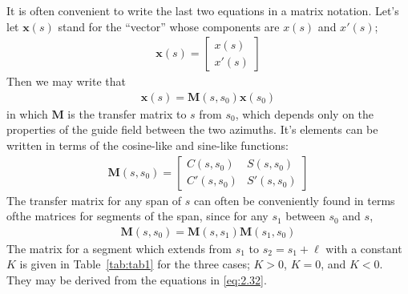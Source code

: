 It is often convenient to write the last two equations in a matrix notation. Let's let $\boldsymbol{x}(s)$ stand for the “vector” whose components are $x(s)$ and $x'(s)$;
\begin{align}
	\boldsymbol{x}(s) = \begin{bmatrix}
	x(s)\\
	x'(s)
	\end{bmatrix}
\end{align}
Then we may write that
\begin{align}
	\boldsymbol{x}(s)=\boldsymbol{M}(s,s_0)\boldsymbol{x}(s_0)
\end{align}
in which $\boldsymbol{M}$ is the transfer matrix to $s$ from $s_0$, which depends only on the properties of the guide field between the two azimuths. It's elements can be written in terms of the cosine-like and sine-like functions:
\begin{align}
	\boldsymbol{M}(s,s_0) = \begin{bmatrix}
	C(s,s_0) & S(s,s_0)\\
	C'(s,s_0) & S'(s,s_0)
	\end{bmatrix}\label{eq:2.37}
\end{align}
The transfer matrix for any span of $s$ can often be conveniently found in terms ofthe matrices for segments of the span, since for any $s_1$ between $s_0$ and $s$,
\begin{align}
	\boldsymbol{M}(s,s_0) = \boldsymbol{M}(s,s_1)\boldsymbol{M}(s_1,s_0)
\end{align}
The matrix for a segment which extends from $s_1$ to $s_2 = s_1 + \ell$ with a constant $K$ is given in Table~\ref{tab:tab1} for the three cases; $K > 0$, $K = 0$, and $K < 0$. They may be derived from the equations in \eqref{eq:2.32}.

